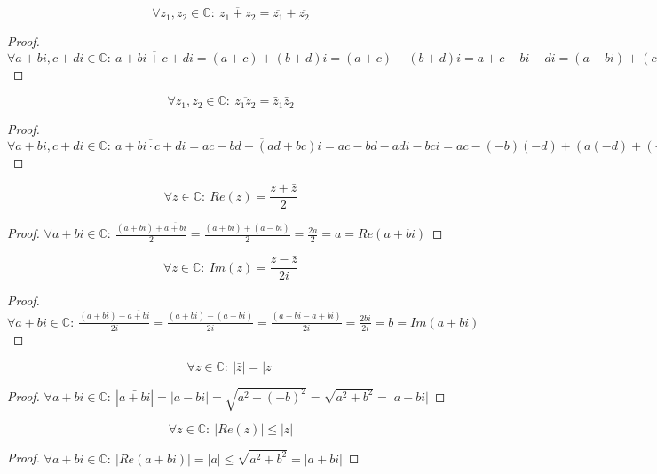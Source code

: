 \documentclass[main.tex]{subfiles}
\begin{document}
\begin{pr}
  \label{pr:modulus-door-optelling}
  \[ \forall z_{1},z_{2}\in \mathbb{C}:\ \overline{z_{1}+z_{2}} = \overline{z_{1}} + \overline{z_{2}} \]

  \begin{proof}
    $\forall a+bi,c+di \in \mathbb{C}:\ \overline{a+bi + c+di} = \overline{(a+c)+(b+d)i} =(a+c)-(b+d)i = a+c-bi-di = (a-bi) + (c-di)$
  \end{proof}
\end{pr}

\begin{pr}
  \[ \forall z_{1},z_{2}\in \mathbb{C}:\ \overline{z_{1}z_{2}} = \bar{z}_{1}  \bar{z}_{2} \]

  \begin{proof}
    $\forall a+bi,c+di \in \mathbb{C}:\ \overline{a+bi \cdot c+di} = \overline{ac-bd + (ad+bc)i} = ac-bd - adi - bci = ac-(-b)(-d) + (a(-d)+(-b)c)i = \overline{a+bi} \cdot \overline{c+di} $
  \end{proof}
\end{pr}

\begin{pr}
  \[ \forall z\in \mathbb{C}:\ Re(z) = \frac{z+\bar{z}}{2} \]

  \begin{proof}
    $\forall a+bi\in \mathbb{C}:\ \frac{(a+bi)+\overline{a+bi}}{2} = \frac{(a+bi)+(a-bi)}{2} = \frac{2a}{2} = a = Re(a+bi)$
  \end{proof}
\end{pr}

\begin{pr}
  \[ \forall z\in \mathbb{C}:\ Im(z) = \frac{z-\bar{z}}{2i} \]

  \begin{proof}
    $\forall a+bi\in \mathbb{C}:\ \frac{(a+bi)-\overline{a+bi}}{2i} = \frac{(a+bi)-(a-bi)}{2i} = \frac{(a+bi-a+bi)}{2i} = \frac{2bi}{2i} = b = Im(a+bi) $
  \end{proof}
\end{pr}

\begin{pr}
  \[ \forall z\in \mathbb{C}:\ |\bar{z}| = |z| \]

  \begin{proof}
    $\forall a+bi\in \mathbb{C}:\ |\bar{a+bi}| = |a-bi| = \sqrt{a^{2}+(-b)^{2}} = \sqrt{a^{2}+b^{2}} = |a+bi|$
  \end{proof}
\end{pr}

\begin{pr}
  \label{pr:reel-deel-kleiner}
  \[ \forall z\in \mathbb{C}:\ |Re(z)| \le |z| \]

  \begin{proof}
    $\forall a+bi\in \mathbb{C}:\  |Re(a+bi)| = |a| \le \sqrt{a^{2}+b^{2}} = |a+bi|$ 
  \end{proof}
\end{pr}
\end{document}

